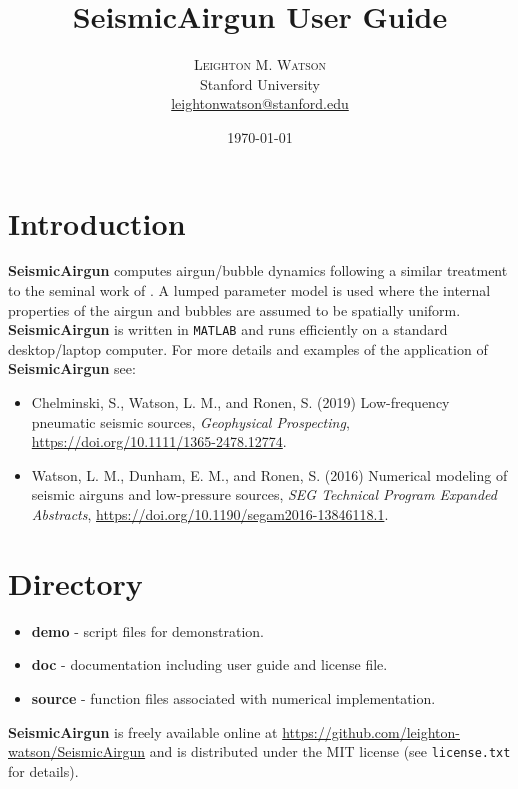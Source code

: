 \documentclass[10pt]{article}
\title{SeismicAirgun User Guide} %
\author{%
\textsc{Leighton M. Watson} \\%
\normalsize Stanford University \\ %
\normalsize \href{mailto:leightonwatson@stanford.edu}{leightonwatson@stanford.edu} %
}
\date{\today} %
\begin{document}
\maketitle


\section{Introduction}
{\bf SeismicAirgun} computes airgun/bubble dynamics following a similar treatment to the seminal work of \citet{Ziolkowski1970}. A lumped parameter model is used where the internal properties of the airgun and bubbles are assumed to be spatially uniform. {\bf SeismicAirgun} is written in \texttt{MATLAB} and runs efficiently on a standard desktop/laptop computer. For more details and examples of the application of {\bf SeismicAirgun} see:
\begin{itemize}
\item Chelminski, S., Watson, L. M., and Ronen, S. (2019) Low-frequency pneumatic seismic sources, \emph{Geophysical Prospecting}, \href{https://doi.org/10.1111/1365-2478.12774}{https://doi.org/10.1111/1365-2478.12774}.
\item Watson, L. M., Dunham, E. M., and Ronen, S. (2016) Numerical modeling of seismic airguns and low-pressure sources, \emph{SEG Technical Program Expanded Abstracts}, \href{https://doi.org/10.1190/segam2016-13846118.1}{https://doi.org/10.1190/segam2016-13846118.1}.
\end{itemize}

\section{Directory}
\begin{itemize}
\item {\bf demo} - script files for demonstration.
\item {\bf doc} - documentation including user guide and license file.
\item{\bf source} - function files associated with numerical implementation. 
\end{itemize}

{\bf SeismicAirgun} is freely available online at \href{https://github.com/leighton-watson/SeismicAirgun}{https://github.com/leighton-watson/SeismicAirgun} and is distributed under the MIT license (see \texttt{license.txt} for details). 
\end{document}

